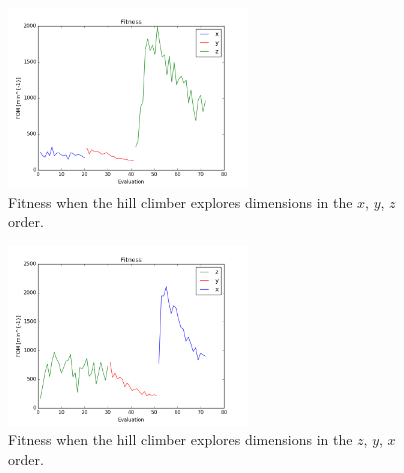 \documentclass[conference]{IEEEtran}
\begin{document}
\begin{figure}[!t]
  \centering
  \includegraphics[width=2.5in]{fitness_xyz}
  \caption{Fitness when the hill climber explores dimensions in the $x$, $y$, $z$ order.}
  \label{fig:fitness_xyz}
\end{figure}

\begin{figure}[!t]
  \centering
  \includegraphics[width=2.5in]{fitness_zyx}
  \caption{Fitness when the hill climber explores dimensions in the $z$, $y$, $x$ order.}
  \label{fig:fitness_zyx}
\end{figure}
\end{document}
